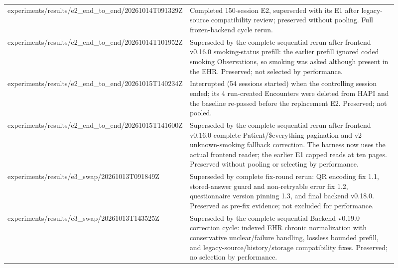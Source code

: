 \begin{longtable}{>{\raggedright\arraybackslash}p{0.31\linewidth}>{\raggedright\arraybackslash}p{0.6\linewidth}}
experiments/\allowbreak{}results/\allowbreak{}e2\_\allowbreak{}end\_\allowbreak{}to\_\allowbreak{}end/\allowbreak{}20261014T091329Z & Completed 150-\allowbreak{}session E2, superseded with its E1 after legacy-\allowbreak{}source compatibility review; preserved without pooling.\allowbreak{} Full frozen-\allowbreak{}backend cycle rerun.\allowbreak{} \\
experiments/\allowbreak{}results/\allowbreak{}e2\_\allowbreak{}end\_\allowbreak{}to\_\allowbreak{}end/\allowbreak{}20261014T101952Z & Superseded by the complete sequential rerun after frontend v0.\allowbreak{}16.\allowbreak{}0 smoking-\allowbreak{}status prefill:\allowbreak{} the earlier prefill ignored coded smoking Observations, so smoking was asked although present in the EHR.\allowbreak{} Preserved; not selected by performance.\allowbreak{} \\
experiments/\allowbreak{}results/\allowbreak{}e2\_\allowbreak{}end\_\allowbreak{}to\_\allowbreak{}end/\allowbreak{}20261015T140234Z & Interrupted (54 sessions started) when the controlling session ended; its 4 run-\allowbreak{}created Encounters were deleted from HAPI and the baseline re-\allowbreak{}passed before the replacement E2.\allowbreak{} Preserved; not pooled.\allowbreak{} \\
experiments/\allowbreak{}results/\allowbreak{}e2\_\allowbreak{}end\_\allowbreak{}to\_\allowbreak{}end/\allowbreak{}20261015T141600Z & Superseded by the complete sequential rerun after frontend v0.\allowbreak{}16.\allowbreak{}0 complete Patient/\allowbreak{}\$everything pagination and v2 unknown-\allowbreak{}smoking fallback correction.\allowbreak{} The harness now uses the actual frontend reader; the earlier E1 capped reads at ten pages.\allowbreak{} Preserved without pooling or selecting by performance.\allowbreak{} \\
experiments/\allowbreak{}results/\allowbreak{}e3\_\allowbreak{}swap/\allowbreak{}20261013T091849Z & Superseded by complete fix-\allowbreak{}round rerun:\allowbreak{} QR encoding fix 1.\allowbreak{}1, stored-\allowbreak{}answer guard and non-\allowbreak{}retryable error fix 1.\allowbreak{}2, questionnaire version pinning 1.\allowbreak{}3, and final backend v0.\allowbreak{}18.\allowbreak{}0.\allowbreak{} Preserved as pre-\allowbreak{}fix evidence; not excluded for performance.\allowbreak{} \\
experiments/\allowbreak{}results/\allowbreak{}e3\_\allowbreak{}swap/\allowbreak{}20261013T143525Z & Superseded by the complete sequential Backend v0.\allowbreak{}19.\allowbreak{}0 correction cycle:\allowbreak{} indexed EHR chronic normalization with conservative unclear/\allowbreak{}failure handling, lossless bounded prefill, and legacy-\allowbreak{}source/\allowbreak{}history/\allowbreak{}storage compatibility fixes.\allowbreak{} Preserved; no selection by performance.\allowbreak{} \\

\end{longtable}
